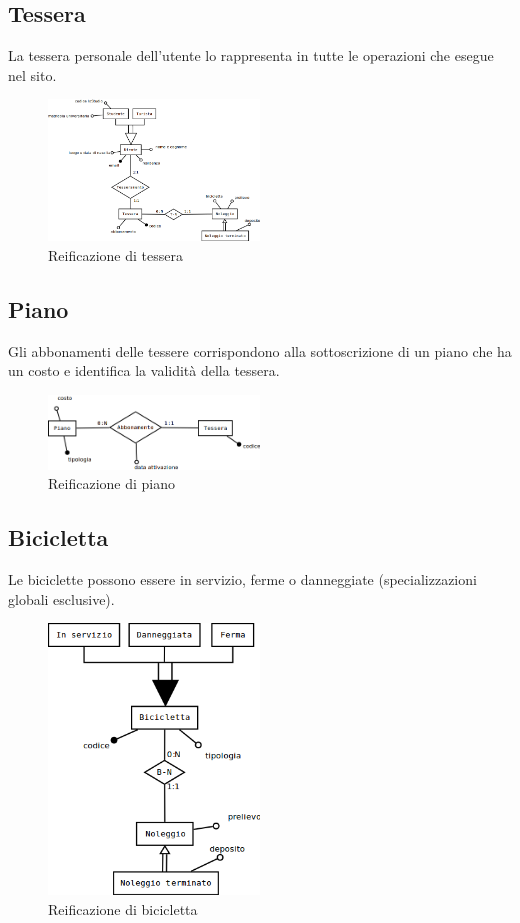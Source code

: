 \documentclass[a4paper,twoside]{article}
\begin{document}
\subsection{Tessera}
La tessera personale dell'utente lo rappresenta in tutte le operazioni che esegue nel sito.
\begin{figure}[H]
 \centering
  \includegraphics[width=0.5\textwidth]{Immagini-Grafici/Concettuale04.png}
\caption{Reificazione di tessera}
\end{figure}

\subsection{Piano}
Gli abbonamenti delle tessere corrispondono alla sottoscrizione di un piano che ha un costo e identifica la validità della tessera.
\begin{figure}[H]
 \centering
  \includegraphics[width=0.5\textwidth]{Immagini-Grafici/Concettuale05.png}
\caption{Reificazione di piano}
\end{figure}

\subsection{Bicicletta}
Le biciclette possono essere in servizio, ferme o danneggiate (specializzazioni globali esclusive).
\begin{figure}[H]
 \centering
  \includegraphics[width=0.5\textwidth]{Immagini-Grafici/Concettuale06.png}
\caption{Reificazione di bicicletta}
\end{figure}
\end{document}
